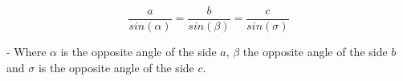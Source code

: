 \vspace{1em}
\sffamily
\bgroup

$$\frac{a}{sin(\alpha)} = \frac{b}{sin(\beta)} = \frac{c}{sin(\sigma)}$$

- Where $\alpha$ is the opposite angle of the side $a$, $\beta$ the opposite angle of the side $b$
and $\sigma$ is the opposite angle of the side $c$.

\egroup
\vspace{1em}